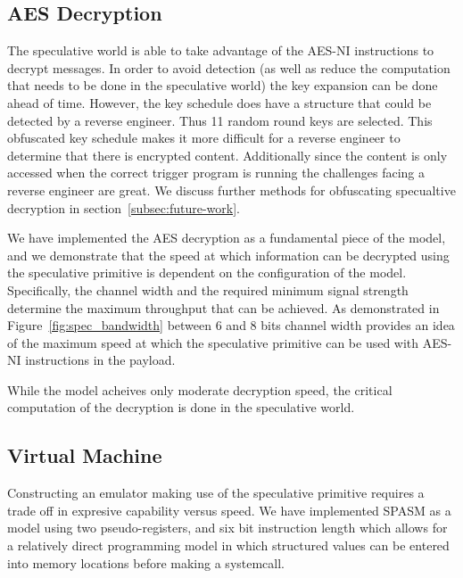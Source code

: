 

\subsection{AES Decryption}
\label{subsec:impl-aes}
The speculative world is able to take advantage of the AES-NI instructions to
decrypt messages. In order to avoid detection (as well as reduce the computation
that needs to be done in the speculative world) the key expansion can be done
ahead of time. However, the key schedule does have a structure that could be
detected by a reverse engineer. Thus 11 random round keys are selected. This
obfuscated key schedule makes it more difficult for a reverse engineer to
determine that there is encrypted content. Additionally since the content is
only accessed when the correct trigger program is running the challenges facing
a reverse engineer are great. We discuss further methods for obfuscating
specualtive decryption in section~\ref{subsec:future-work}. 


We have implemented the AES decryption as a fundamental piece of the \speculake model,
and we demonstrate that the speed at which information can be decrypted using the speculative 
primitive is dependent on the configuration of the \speculake model. Specifically,
the channel width and the required minimum signal strength determine the maximum
throughput that can be achieved. As demonstrated in Figure~\ref{fig:spec_bandwidth} 
between 6 and 8 bits channel width provides an idea of the maximum speed at which the 
speculative primitive can be used with AES-NI instructions in the payload. 

While the \speculake model acheives only moderate decryption speed, the 
critical computation of the decryption is done in the speculative world. 

\FigSpecBandwidth

\subsection{Virtual Machine}
\label{subsec:spasm}

Constructing an emulator making use of the speculative primitive requires  
a trade off in expresive capability versus speed. 
We have implemented SPASM as a model using two pseudo-registers, and six 
bit instruction length which allows for a relatively direct programming model 
in which structured values can be entered into memory locations before making 
a systemcall.

